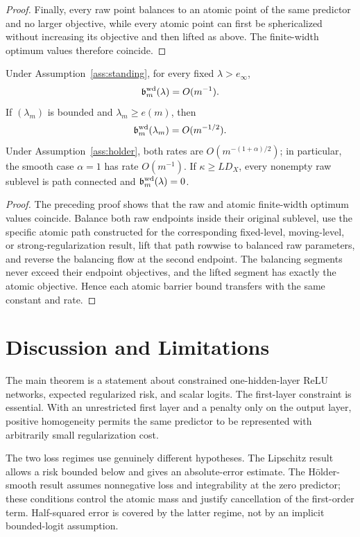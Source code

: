 \documentclass[smallextended,envcountsect]{svjour3}
\newcommand{\SubBar}{\mathfrak b}
\begin{document}
\begin{proof}
Finally, every raw point balances to an atomic point of the same predictor and
no larger objective, while every atomic point can first be sphericalized
without increasing its objective and then lifted as above.  The finite-width
optimum values therefore coincide.
\end{proof}

\begin{corollary}
\label{cor:wd-rates}
Under Assumption~\ref{ass:standing}, for every fixed $\lambda>e_\infty$,
\[
 \SubBar_m^{\rm wd}(\lambda)=O(m^{-1}).
\]
If $(\lambda_m)$ is bounded and $\lambda_m\ge e(m)$, then
\[
 \SubBar_m^{\rm wd}(\lambda_m)=O(m^{-1/2}).
\]
Under Assumption~\ref{ass:holder}, both rates are
$O(m^{-(1+\alpha)/2})$; in particular, the smooth case $\alpha=1$ has
rate $O(m^{-1})$.  If $\kappa\ge LD_X$, every nonempty raw sublevel is path
connected and $\SubBar_m^{\rm wd}(\lambda)=0$.
\end{corollary}

\begin{proof}
The preceding proof shows that the raw and atomic finite-width optimum values
coincide.  Balance both raw endpoints inside their original sublevel, use the
specific atomic path constructed for the corresponding fixed-level,
moving-level, or strong-regularization result, lift that path rowwise to
balanced raw parameters, and reverse the balancing flow at the second
endpoint.  The balancing segments never exceed their endpoint objectives, and
the lifted segment has exactly the atomic objective.  Hence each atomic
barrier bound transfers with the same constant and rate.
\end{proof}



\section{Discussion and Limitations}\label{sec:discussion}

The main theorem is a statement about constrained one-hidden-layer ReLU networks, expected regularized risk, and scalar logits. The first-layer constraint is essential. With an unrestricted first layer and a penalty only on the output layer, positive homogeneity permits the same predictor to be represented with arbitrarily small regularization cost.

The two loss regimes use genuinely different hypotheses.  The Lipschitz result
allows a risk bounded below and gives an absolute-error estimate.  The
H\"older-smooth result assumes nonnegative loss and integrability at the zero
predictor; these conditions control the atomic mass and justify cancellation
of the first-order term.  Half-squared error is covered by the latter regime,
not by an implicit bounded-logit assumption.
\end{document}
